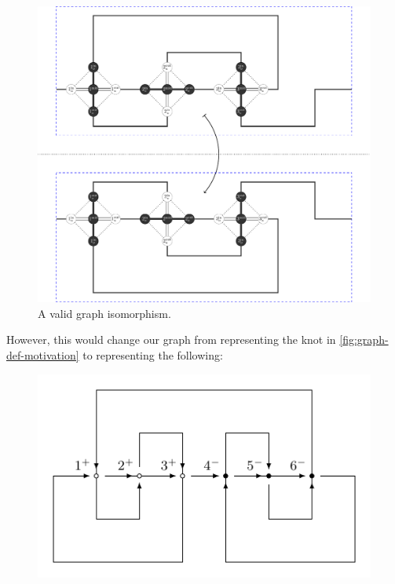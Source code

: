 \begin{figure}[H]
  \centering
  \begin{minipage}{.8\textwidth}
    \begin{turn}{90}
      \centering
      \includegraphics[scale=.6125]{figures/unknotting-moves-and-combinatorial-representations/3-1-knot-and-flip.pdf}
    \end{turn}
  \end{minipage}
  \caption{A valid graph isomorphism.}
  \label{fig:undesirable-flip}
\end{figure}
However, this would change our graph from representing the knot in
\cref{fig:graph-def-motivation} to representing the following:
\begin{figure}[H]
  \centering
  \includegraphics[scale=.7]{figures/unknotting-moves-and-combinatorial-representations/3-1-csum-2.pdf}
\end{figure}
